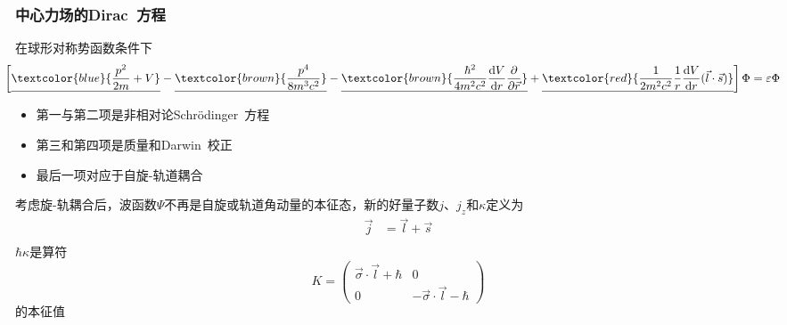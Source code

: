 \frame
{
	\frametitle{中心力场的\textrm{Dirac~}方程}
	在球形对称势函数条件下
	\begin{displaymath}
		\hspace*{-10pt}\left[ \underline{\textcolor{blue}{\frac{p^2}{2m}+V}}-\underline{\textcolor{brown}{\frac{p^4}{8m^3c^2}}}-\underline{\textcolor{brown}{\frac{\hbar^2}{4m^2c^2}\frac{\mathrm{d}V}{\mathrm{d}r}\frac{\partial}{\partial\vec r}}}+\underline{\textcolor{red}{\frac1{2m^2c^2}\frac1r\frac{\mathrm{d}V}{\mathrm{d}r}(\vec l\cdot\vec s)}} \right]\Phi=\varepsilon\Phi
	\end{displaymath}
	\begin{itemize}
		\item 第一与第二项是非相对论\textrm{Schr\"odinger~}方程
		\item 第三和第四项是质量和\textrm{Darwin~}校正
		\item 最后一项对应于自旋-轨道耦合
	\end{itemize}
	考虑旋-轨耦合后，波函数$\Psi$不再是自旋或轨道角动量的本征态，新的好量子数$j$、$j_z$和$\kappa$定义为
	$$\begin{aligned}
		\vec j&=\vec l+\vec s\\
	\end{aligned}$$
	$\hbar\kappa$是算符
	\begin{displaymath}
		K=\left( 
		\begin{matrix}
			\vec{\sigma}\cdot\vec l+\hbar &0\\
			0 &-\vec{\sigma}\cdot\vec l-\hbar
		\end{matrix}
		\right)
	\end{displaymath}
	的本征值
%	
}

